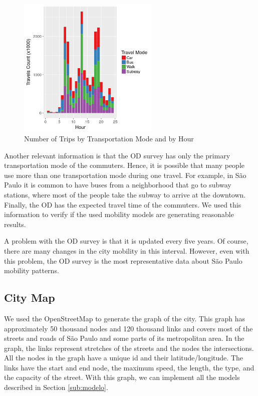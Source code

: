 \begin{figure}[!htb]
\centering
\includegraphics[width=0.6\textwidth]{figuras/chap-sp/mode.png}
\caption{Number of Trips by Transportation Mode and by Hour}
\label{fig:travel_count_mode_and_hour}
\end{figure}

Another relevant information is that the OD survey has only the primary transportation mode of the commuters. Hence, it is possible that many people use more than one transportation mode during one travel. For example, in S\~ao Paulo it is common to have buses from a neighborhood that go to subway stations, where most of the people take the subway to arrive at the downtown. Finally, the OD has the expected travel time of the commuters. We used this information to verify if the used mobility models are generating reasonable results.

A problem with the OD survey is that it is updated every five years. Of course, there are many changes in the city mobility in this interval. However, even with this problem, the OD survey is the most representative data about S\~ao Paulo mobility patterns.

\subsection{City Map}

We used the OpenStreetMap to generate the graph of the city. This graph has approximately 50 thousand nodes and 120 thousand links and covers most of the streets and roads of S\~ao Paulo and some parts of its metropolitan area. In the graph, the links represent stretches of the streets and the nodes the intersections. All the nodes in the graph have a unique id and their latitude/longitude. The links have the start and end node, the maximum speed, the length, the type, and the capacity of the street. With this graph, we can implement all the models described in Section \ref{sub:modelo}.

